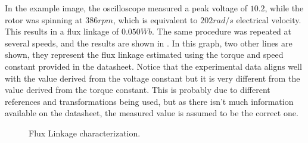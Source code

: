 In the example image, the oscilloscope measured a peak voltage of $10.2$, while the rotor was spinning at $386rpm$, which is equivalent to $202rad/s$ electrical velocity. This results in a flux linkage of $0.050 Wb$. The same procedure was repeated at several speeds, and the results are shown in . In this graph, two other lines are shown, they represent the flux linkage estimated using the torque and speed constant provided in the datasheet. Notice that the experimental data aligns well with the value derived from the voltage constant but it is very different from the value derived from the torque constant. This is probably due to different references and transformations being used, but as there isn't much information available on the datasheet, the measured value is assumed to be the correct one.

\begin{figure}[!htb]
    \begin{subfigmatrix}{2}
    \end{subfigmatrix}
    \caption{Flux Linkage characterization.}
    \label{fig:flux_linkage_characterization}%
\end{figure}

